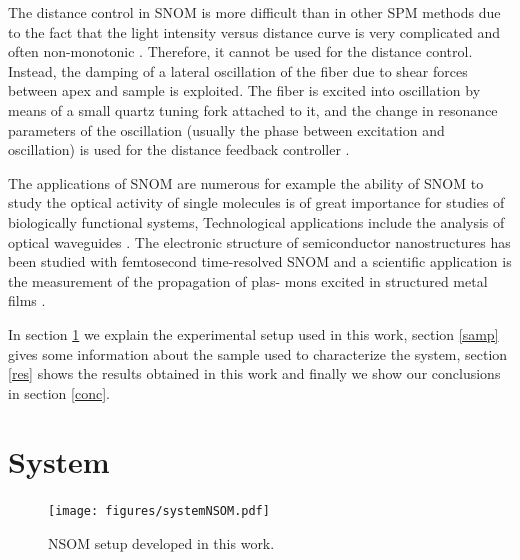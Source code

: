 \documentclass[reprint,aps,prb,citeautoscript,altaffilletter]{revtex4-2}
\begin{document}
	\par The distance control in SNOM is more difficult than in other SPM methods due to the fact that the light intensity versus distance curve is very complicated and often non-monotonic \cite{otshu-nf2}. Therefore, it cannot be used for the distance control. Instead, the damping of a lateral oscillation
	of the fiber due to shear forces between apex and sample is exploited. The fiber is excited into oscillation by means of a small quartz tuning fork attached to it, and the change in resonance parameters of the oscillation (usually the phase between excitation and oscillation) is used for the distance feedback controller \cite{otshu-nf}.
	\par The applications of SNOM are numerous for example the ability of SNOM to study the optical activity of single molecules is of great importance for studies of biologically functional systems, Technological applications include the analysis of optical waveguides \cite{paper1}. The electronic structure
	of semiconductor nanostructures has been studied with femtosecond time-resolved SNOM \cite{doi:10.1063/1.126446} and a scientific application is the measurement of the propagation of plas-
	mons excited in structured metal films \cite{PhysRevB.63.155404}.

	\par In section \ref{sys} we explain the experimental setup used in this work, section \ref{samp} gives some information about the sample used to characterize the system, section \ref{res} shows the results obtained in this work and finally we show our conclusions in section \ref{conc}.

	\section{System} \label{sys}
	\begin{figure}[!hbt]
		\centering
		\texttt{[image: figures/systemNSOM.pdf]}

		\caption{NSOM setup developed in this work.}
		\label{fig:Sys}
	\end{figure}
\end{document}
